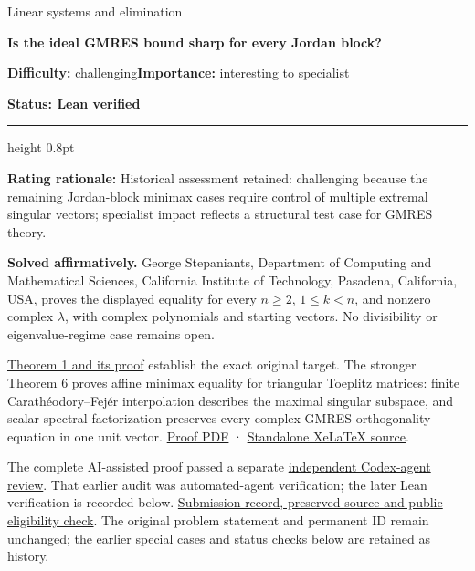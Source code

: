 \documentclass[11pt,a4paper]{article}
\makeatletter
\renewcommand{\subsection}{\Needspace{4\baselineskip}\@startsection{subsection}{2}{0pt}{9pt plus 1pt minus 1pt}{3pt}{\sffamily\bfseries\normalsize\color{ink}}}
\makeatother
\begin{document}
{\sffamily\small\color{muted}Linear systems and elimination\par}
\vspace{3pt}
{\raggedright{}\sffamily\bfseries\fontsize{21}{24}\selectfont\color{ink}Is
the ideal GMRES bound sharp for every Jordan block?\par}
\vspace{7pt}
{\sffamily\small\textbf{Difficulty:} challenging\quad\textbf{Importance:} interesting
to specialist\par}
{\sffamily\small\bfseries\color{accent}Status: Lean verified\par}
\vspace{4pt}
{\color{accent}\hrule height 0.8pt}
\vspace{6pt}
\textbf{Rating rationale:} Historical assessment retained: challenging
because the remaining Jordan-block minimax cases require control of
multiple extremal singular vectors; specialist impact reflects a
structural test case for GMRES theory.

\subsection{Resolution --- 2026-09-11}\label{resolution-2026-09-11}

\textbf{Solved affirmatively.} George Stepaniants, Department of
Computing and Mathematical Sciences, California Institute of Technology,
Pasadena, California, USA, proves the displayed equality for every
\(n\ge2\), \(1\le k< n\), and nonzero complex \(\lambda\), with complex
polynomials and starting vectors. No divisibility or eigenvalue-regime
case remains open.

\href{https://github.com/ajt60gaibb/OpenProblemsInNLA/blob/main/linear-systems-and-elimination/IE-02/solution.md}{Theorem
1 and its proof} establish the exact original target. The stronger
Theorem 6 proves affine minimax equality for triangular Toeplitz
matrices: finite Carathéodory--Fejér interpolation describes the maximal
singular subspace, and scalar spectral factorization preserves every
complex GMRES orthogonality equation in one unit vector.
\href{https://github.com/ajt60gaibb/OpenProblemsInNLA/blob/main/linear-systems-and-elimination/IE-02/solution.pdf}{Proof
PDF} ·
\href{https://github.com/ajt60gaibb/OpenProblemsInNLA/blob/main/linear-systems-and-elimination/IE-02/solution.tex}{Standalone
XeLaTeX source}.

The complete AI-assisted proof passed a separate
\href{https://github.com/ajt60gaibb/OpenProblemsInNLA/blob/main/references/stepaniants-ie02-2026-09-11/verification/IE-02-independent-review.md}{independent
Codex-agent review}. That earlier audit was automated-agent
verification; the later Lean verification is recorded below.
\href{https://github.com/ajt60gaibb/OpenProblemsInNLA/blob/main/references/stepaniants-ie02-2026-09-11/README.md}{Submission
record, preserved source and public eligibility check}. The original
problem statement and permanent ID remain unchanged; the earlier special
cases and status checks below are retained as history.
\end{document}
